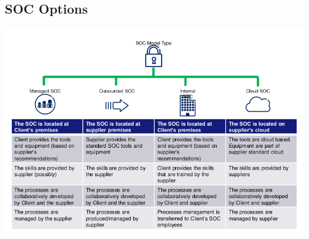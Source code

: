 \documentclass[a4]{article}
\begin{document}
\begin{multicols}{3}
\subsection{SOC Options}
\begin{center}
    \begin{minipage}{\columnwidth}
        \includegraphics[width=\columnwidth]{soc-options.png}
    \end{minipage}
\end{center}

\end{multicols}
\end{document}
